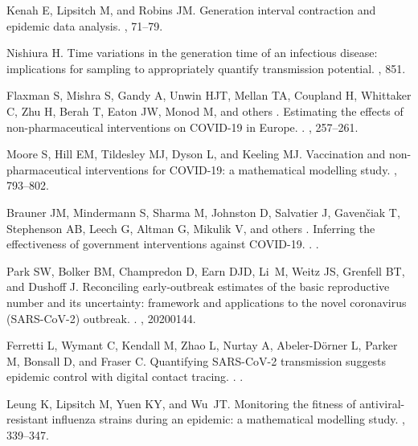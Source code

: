 \documentclass[12pt]{article}
\begin{document}
\begin{thebibliography}{10}
Kenah E, Lipsitch M, and Robins JM.
 Generation interval contraction and epidemic data analysis.
, 71--79.

Nishiura H.
 Time variations in the generation time of an infectious disease:
  implications for sampling to appropriately quantify transmission potential.
, 851.

Flaxman S, Mishra S, Gandy A, Unwin HJT, Mellan TA, Coupland H, Whittaker C,
  Zhu H, Berah T, Eaton JW, Monod M, and others .
 {Estimating the effects of non-pharmaceutical interventions on
  COVID-19 in Europe}.
.
, 257--261.

Moore S, Hill EM, Tildesley MJ, Dyson L, and Keeling MJ.
 {Vaccination and non-pharmaceutical interventions for COVID-19:
  a mathematical modelling study}.
, 793--802.

Brauner JM, Mindermann S, Sharma M, Johnston D, Salvatier J, Gaven{\v{c}}iak T,
  Stephenson AB, Leech G, Altman G, Mikulik V, and others .
 {Inferring the effectiveness of government interventions against
  COVID-19}.
.
.

Park SW, Bolker BM, Champredon D, Earn DJD, Li~M, Weitz JS, Grenfell BT, and
  Dushoff J.
 {Reconciling early-outbreak estimates of the basic reproductive
  number and its uncertainty: framework and applications to the novel
  coronavirus (SARS-CoV-2) outbreak}.
.
, 20200144.

Ferretti L, Wymant C, Kendall M, Zhao L, Nurtay A, Abeler-D{\"o}rner L, Parker
  M, Bonsall D, and Fraser C.
 {Quantifying SARS-CoV-2 transmission suggests epidemic control
  with digital contact tracing}.
.
.

Leung K, Lipsitch M, Yuen KY, and Wu~JT.
 Monitoring the fitness of antiviral-resistant influenza strains
  during an epidemic: a mathematical modelling study.
, 339--347.


\end{thebibliography}
\end{document}
